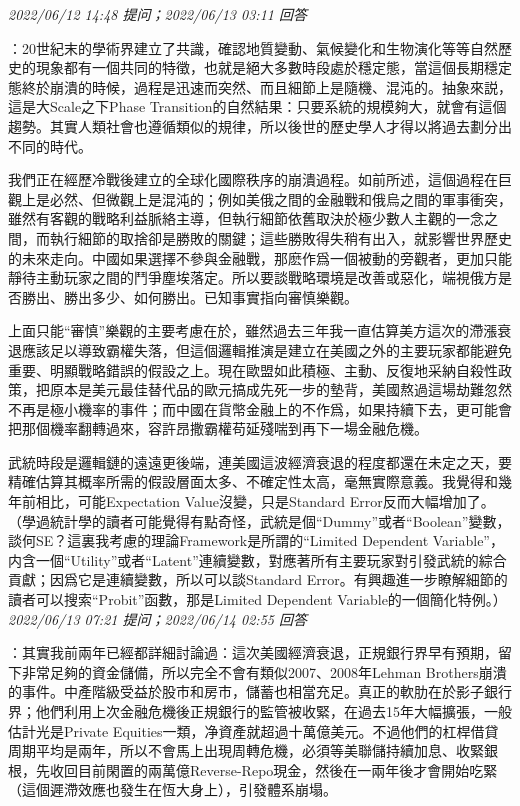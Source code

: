 \documentclass[twocolumn]{ctexart}
\begin{document}
\textit{\hfill\noindent\small 2022/06/12 14:48 提问；2022/06/13 03:11 回答}

：20世紀末的學術界建立了共識，確認地質變動、氣候變化和生物演化等等自然歷史的現象都有一個共同的特徵，也就是絕大多數時段處於穩定態，當這個長期穩定態終於崩潰的時候，過程是迅速而突然、而且細節上是隨機、混沌的。抽象來説，這是大Scale之下Phase Transition的自然結果：只要系統的規模夠大，就會有這個趨勢。其實人類社會也遵循類似的規律，所以後世的歷史學人才得以將過去劃分出不同的時代。

我們正在經歷冷戰後建立的全球化國際秩序的崩潰過程。如前所述，這個過程在巨觀上是必然、但微觀上是混沌的；例如美俄之間的金融戰和俄烏之間的軍事衝突，雖然有客觀的戰略利益脈絡主導，但執行細節依舊取決於極少數人主觀的一念之間，而執行細節的取捨卻是勝敗的關鍵；這些勝敗得失稍有出入，就影響世界歷史的未來走向。中國如果選擇不參與金融戰，那麽作爲一個被動的旁觀者，更加只能靜待主動玩家之間的鬥爭塵埃落定。所以要談戰略環境是改善或惡化，端視俄方是否勝出、勝出多少、如何勝出。已知事實指向審慎樂觀。

上面只能“審慎”樂觀的主要考慮在於，雖然過去三年我一直估算美方這次的滯漲衰退應該足以導致霸權失落，但這個邏輯推演是建立在美國之外的主要玩家都能避免重要、明顯戰略錯誤的假設之上。現在歐盟如此積極、主動、反復地采納自殺性政策，把原本是美元最佳替代品的歐元搞成先死一步的墊背，美國熬過這場劫難忽然不再是極小機率的事件；而中國在貨幣金融上的不作爲，如果持續下去，更可能會把那個機率翻轉過來，容許昂撒霸權苟延殘喘到再下一場金融危機。

武統時段是邏輯鏈的遠遠更後端，連美國這波經濟衰退的程度都還在未定之天，要精確估算其概率所需的假設層面太多、不確定性太高，毫無實際意義。我覺得和幾年前相比，可能Expectation Value沒變，只是Standard Error反而大幅增加了。（學過統計學的讀者可能覺得有點奇怪，武統是個“Dummy”或者“Boolean”變數，談何SE？這裏我考慮的理論Framework是所謂的“Limited Dependent Variable”，内含一個“Utility”或者“Latent”連續變數，對應著所有主要玩家對引發武統的綜合貢獻；因爲它是連續變數，所以可以談Standard Error。有興趣進一步瞭解細節的讀者可以搜索“Probit”函數，那是Limited Dependent Variable的一個簡化特例。）
\\

\textit{\hfill\noindent\small 2022/06/13 07:21 提问；2022/06/14 02:55 回答}

：其實我前兩年已經都詳細討論過：這次美國經濟衰退，正規銀行界早有預期，留下非常足夠的資金儲備，所以完全不會有類似2007、2008年Lehman Brothers崩潰的事件。中產階級受益於股市和房市，儲蓄也相當充足。真正的軟肋在於影子銀行界；他們利用上次金融危機後正規銀行的監管被收緊，在過去15年大幅擴張，一般估計光是Private Equities一類，净資產就超過十萬億美元。不過他們的杠桿借貸周期平均是兩年，所以不會馬上出現周轉危機，必須等美聯儲持續加息、收緊銀根，先收回目前閑置的兩萬億Reverse-Repo現金，然後在一兩年後才會開始吃緊（這個遲滯效應也發生在恆大身上），引發體系崩塌。
\end{document}
